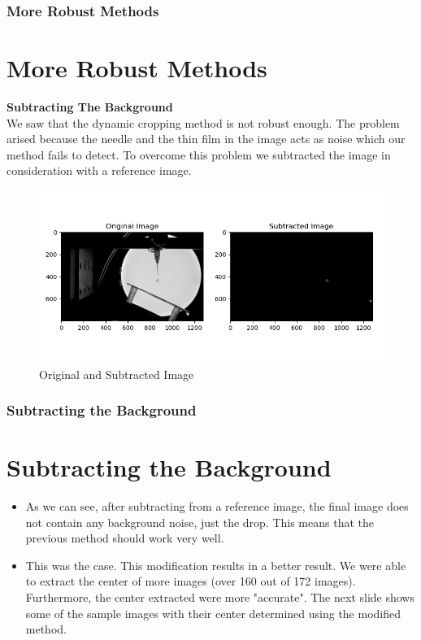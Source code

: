 \documentclass{beamer}
\begin{document}
\begin{frame}
    \frametitle{More Robust Methods}
    \section{More Robust Methods}
    \Large \textbf{Subtracting The Background}\\
    \small
    We saw that the dynamic cropping method is not robust enough. The problem arised because the needle and the thin film in the image acts as noise which our method fails to detect. To overcome this problem we subtracted the image in consideration with a reference image.\\
    \begin{figure}
        \centering
        \includegraphics[scale=0.4]{subtracted.png}
        \caption[]{Original and Subtracted Image}
    \end{figure}
\end{frame}
\begin{frame}
    \frametitle{Subtracting the Background}
    \section{Subtracting the Background}
    \begin{itemize}
        \item <1->  As we can see, after subtracting from a reference image, the final image does not contain any background noise, just the drop. This means that the previous method should work very well.
        \item <2-> This was the case. This modification results in a better result. We were able to extract the center of more images (over 160 out of 172 images). Furthermore, the center extracted were more "accurate". The next slide shows some of the sample images with their center determined using the modified method.
    \end{itemize}
\end{frame}
\end{document}
